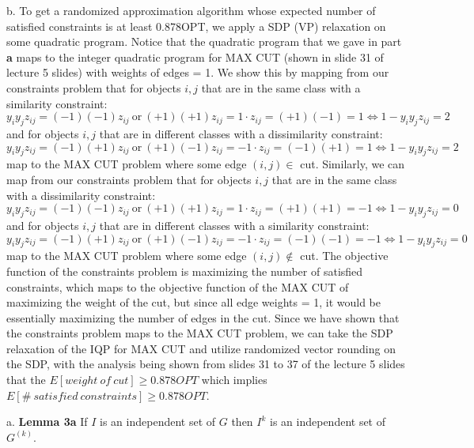 \documentclass[oneside]{homework} %
\begin{document}
{\large b.} To get a randomized approximation algorithm whose expected number of satisfied constraints is at least 0.878OPT, we apply a SDP (VP) relaxation on some quadratic program. Notice that the quadratic program that we gave in part \textbf{a} maps to the integer quadratic program for MAX CUT (shown in slide 31 of lecture 5 slides) with weights of edges = 1. We show this by mapping from our constraints problem that for objects $i, j$ that are in the same class with a similarity constraint: $$y_i y_j z_{ij} = (-1)(-1)z_{ij} \ \text{or} \ (+1)(+1)z_{ij} = 1 \cdot z_{ij} = (+1)(-1) = 1 \Leftrightarrow 1 - y_i y_j z_{ij} = 2$$ and for objects $i, j$ that are in different classes with a dissimilarity constraint: $$y_i y_j z_{ij} = (-1)(+1)z_{ij} \ \text{or} \ (+1)(-1)z_{ij} = -1 \cdot z_{ij} = (-1)(+1) = 1 \Leftrightarrow 1 - y_i y_j z_{ij} = 2$$ map to the MAX CUT problem where some edge $(i,j) \in$ cut. Similarly, we can map from our constraints problem that for objects $i, j$ that are in the same class with a dissimilarity constraint: $$y_i y_j z_{ij} = (-1)(-1)z_{ij} \ \text{or} \ (+1)(+1)z_{ij} = 1 \cdot z_{ij} = (+1)(+1) = -1 \Leftrightarrow 1 - y_i y_j z_{ij} = 0$$ and for objects $i, j$ that are in different classes with a similarity constraint: $$y_i y_j z_{ij} = (-1)(+1)z_{ij} \ \text{or} \ (+1)(-1)z_{ij} = -1 \cdot z_{ij} = (-1)(-1) = -1 \Leftrightarrow 1 - y_i y_j z_{ij} = 0$$ map to the MAX CUT problem where some edge $(i,j) \notin$ cut. The objective function of the constraints problem is maximizing the number of satisfied constraints, which maps to the objective function of the MAX CUT of maximizing the weight of the cut, but since all edge weights = 1, it would be essentially maximizing the number of edges in the cut. 
\newline
\newline
Since we have shown that the constraints problem maps to the MAX CUT problem, we can take the SDP relaxation of the IQP for MAX CUT and utilize randomized vector rounding on the SDP, with the analysis being shown from slides 31 to 37 of the lecture 5 slides that the $E[weight \ of \ cut] \geq 0.878 OPT$ which implies $E[\# \ satisfied \ constraints] \geq 0.878 OPT$.

{\large a.} \textbf{Lemma 3a} If $I$ is an independent set of $G$ then $I^k$ is an independent set of $G^{(k)}$.
\newline
\end{document}
